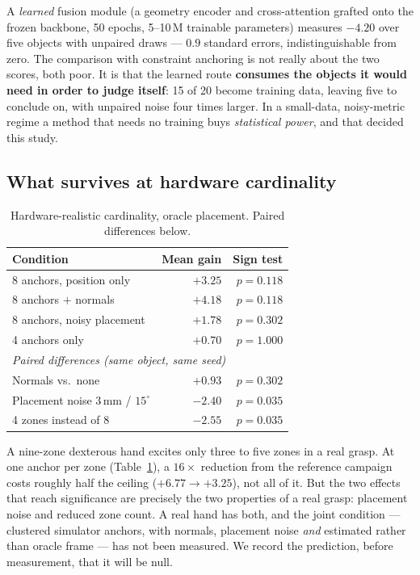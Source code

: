 \documentclass[conference]{IEEEtran}
\newcommand{\gd}[1]{\textbf{#1}}
\newcommand{\lo}[1]{\textbf{#1}}
\begin{document}
A \emph{learned} fusion module (a geometry encoder and cross-attention grafted onto
the frozen backbone, 50 epochs, 5--10\,M trainable parameters) measures $-4.20$ over
five objects with unpaired draws --- $0.9$ standard errors, indistinguishable from
zero. The comparison with constraint anchoring is not really about the two scores,
both poor. It is that the learned route \textbf{consumes the objects it would need in
order to judge itself}: 15 of 20 become training data, leaving five to conclude on,
with unpaired noise four times larger. In a small-data, noisy-metric regime a method
that needs no training buys \emph{statistical power}, and that decided this study.

\subsection{What survives at hardware cardinality}
\label{sec:res-hand}

\begin{table}[t]
\centering
\caption{Hardware-realistic cardinality, oracle placement. Paired differences below.}
\label{tab:hand}
\begin{tabular}{lrr}
\toprule
Condition & Mean gain & Sign test \\
\midrule
8 anchors, position only & $+3.25$ & $p=0.118$ \\
8 anchors $+$ normals & $+4.18$ & $p=0.118$ \\
8 anchors, noisy placement & $+1.78$ & $p=0.302$ \\
4 anchors only & $+0.70$ & $p=1.000$ \\
\midrule
\multicolumn{3}{l}{\emph{Paired differences (same object, same seed)}}\\
Normals vs.\ none & $+0.93$ & $p = 0.302$ \\
Placement noise 3\,mm / $15^\circ$ & \lo{$-2.40$} & \gd{$p = 0.035$} \\
4 zones instead of 8 & \lo{$-2.55$} & \gd{$p = 0.035$} \\
\bottomrule
\end{tabular}
\end{table}

A nine-zone dexterous hand excites only three to five zones in a real grasp. At one
anchor per zone (Table~\ref{tab:hand}), a $16\times$ reduction from the reference
campaign costs roughly half the ceiling ($+6.77 \rightarrow +3.25$), not all of it.
But the two effects that reach significance are precisely the two properties of a real
grasp: placement noise and reduced zone count. A real hand has both, and the joint
condition --- clustered simulator anchors, with normals, placement noise \emph{and}
estimated rather than oracle frame --- has not been measured. We record the prediction,
before measurement, that it will be null.
\end{document}
